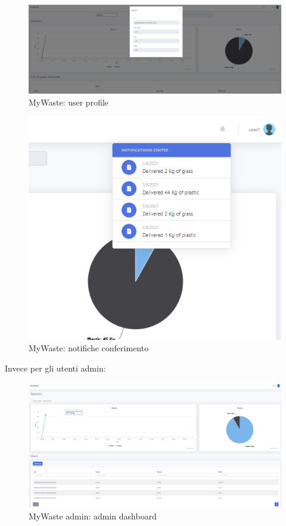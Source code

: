 \documentclass{report}
\begin{document}
\begin{figure}[h!]
    \begin{center}
        \includegraphics[width=1.0\textwidth]{images/userProfile.PNG}  \end{center}
    \caption{MyWaste: user profile}
    \label{fig: userProfile}
\end{figure}
\begin{figure}[h!]
    \begin{center}
        \includegraphics[width=1.0\textwidth]{images/notificheConferimento.PNG}  \end{center}
    \caption{MyWaste: notifiche conferimento}
    \label{fig: notify}
\end{figure}
Invece per gli utenti admin:
\begin{figure}[h!]
    \begin{center}
        \includegraphics[width=1.0\textwidth]{images/adminDashboard.PNG}  \end{center}
    \caption{MyWaste admin: admin dashboard}
    \label{fig: adminDashboard}
\end{figure}
\end{document}
